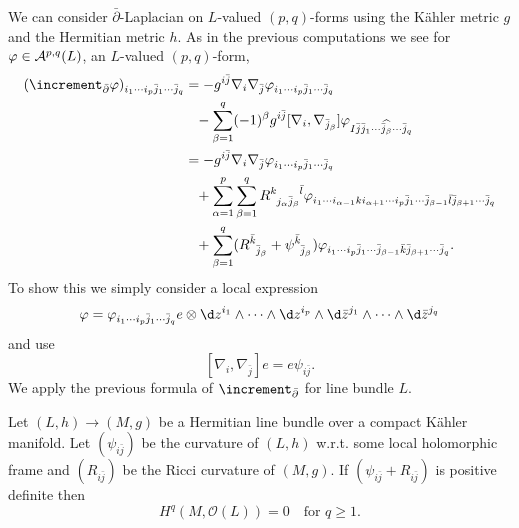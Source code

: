 \documentclass[12pt]{article}
\begin{document}
We can consider \(\bar{\partial}\)-Laplacian on \(L\)-valued \((p,q)\)-forms
using the Kähler metric \(g\) and the Hermitian metric \(h\). As in the previous
computations we see for \(\varphi\in \mathcal{A}^{p,q}(L)\), an \(L\)-valued
\((p,q)\)-form,
\begin{align*}
  (\lap_{\bar{\partial}}\vphi)_{i_1\cdots i_p\bar{j}_1\cdots \bar{j}_q}
  &=-g^{i\bar{j}}\nabla_i\nabla_{\bar{j}}\vphi_{i_1\cdots i_p\bar{j}_1\cdots
  \bar{j}_q} \\
  &\phantom{=}-\sum_{\beta=1}^q (-1)^\beta g^{i\bar{j}}[\nabla_i,\nabla_{\bar{j}
  _\beta}]\vphi_{I\bar{j}\bar{j}_1\cdots\widehat{\bar{j}_\beta}\cdots\bar{j}_q}\\
  &=-g^{i\bar{j}}\nabla_i\nabla_{\bar{j}}\vphi_{i_1\cdots i_p\bar{j}_1\cdots
  \bar{j}_q} \\ &\phantom{=}+\sum_{\alpha=1}^p
  \sum_{\beta=1}^q R\indices{^k_{j_\alpha\bar{j}_{\beta}}^{\bar{l}}}
  \vphi_{i_1\cdots i_{\alpha-1}k i_{\alpha+1}\cdots i_p\bar{j}_1\cdots
  \bar{j}_{\beta-1}\bar{l}\bar{j}_{\beta+1}\cdots \bar{j}_q} \\
  &\phantom{=}+\sum_{\beta=1}^{q}(R\indices{^{\bar{k}}_{\bar{j}_\beta}}
  +\psi\indices{^{\bar{k}}_{\bar{j}_\beta}})\vphi_{i_1\cdots i_p
  \bar{j}_1\cdots \bar{j}_{\beta-1}\bar{k}\bar{j}_{\beta+1}\cdots \bar{j}_q}
.\end{align*}
To show this we simply consider a local expression \[
  \vphi=\vphi_{i_1\cdots i_p\bar{j}_1\cdots \bar{j}_q}
  e\otimes\dd{z^{i_1}}\wedge\cdots\wedge\dd{z^{i_p}}\wedge\dd{\bar{z}^{j_1}}
  \wedge\cdots\wedge\dd{\bar{z}^{j_q}}
\] and use \[
  [\nabla_i,\nabla_{\bar{j}}]e=e\psi_{i\bar{j}}
.\] We apply the previous formula of \(\lap_{\bar{\partial}}\) for line bundle
\(L\).
\begin{theorem}
  Let \((L,h)\to (M,g)\) be a Hermitian line bundle over a compact Kähler
  manifold. Let \((\psi_{i\bar{j}})\) be the curvature of \((L,h)\) w.r.t.
  some local holomorphic frame and \((R_{i\bar{j}})\) be the Ricci curvature
  of \((M,g)\). If \((\psi_{i\bar{j}}+R_{i\bar{j}})\) is positive definite
  then \[
    H^q(M,\mathcal{O}(L))=0\quad \text{for }q\ge 1
  .\] 
\end{theorem}
\end{document}
